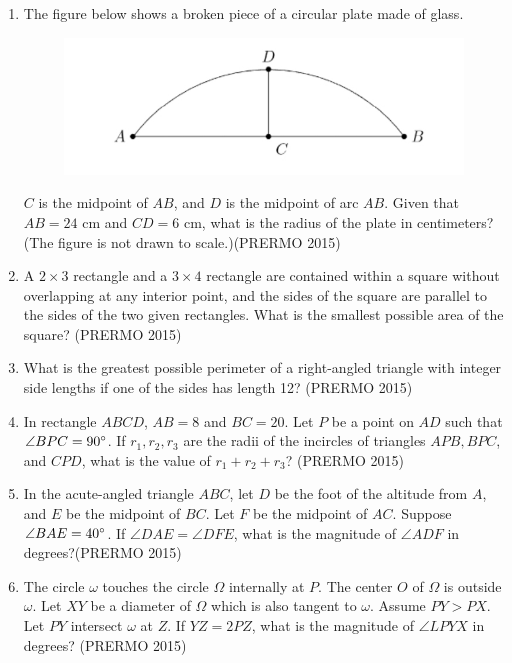 \begin{enumerate}
\item The figure below shows a broken piece of a circular plate made of glass.
    
	  
		\begin{figure}[h!]
    \centering
	    \includegraphics[width=\columnwidth]{olympiad/figs/permo.jpg}
    \end{figure}



    $ C $ is the midpoint of $ AB $, and $ D $ is the midpoint of arc $ AB $. Given that $ AB = 24 $ cm and $ CD = 6 $ cm, what is the radius of the plate in centimeters? (The figure is not drawn to scale.)\hfill(PRERMO 2015)

    \item A $ 2 \times 3 $ rectangle and a $ 3 \times 4 $ rectangle are contained within a square without overlapping at any interior point, and the sides of the square are parallel to the sides of the two given rectangles. What is the smallest possible area of the square? \hfill(PRERMO 2015)

    \item What is the greatest possible perimeter of a right-angled triangle with integer side lengths if one of the sides has length 12? \hfill(PRERMO 2015)

    \item In rectangle $ ABCD $, $ AB = 8 $ and $ BC = 20 $. Let $ P $ be a point on $ AD $ such that $ \angle BPC = 90\degree $. If $ r_1, r_2, r_3 $ are the radii of the incircles of triangles $ APB, BPC $, and $ CPD $, what is the value of $ r_1 + r_2 + r_3 $? \hfill(PRERMO 2015)


\item In the acute-angled triangle $ABC$, let $D$ be the foot of the altitude from $A$, and $E$ be the midpoint of $BC$. Let $F$ be the midpoint of $AC$. Suppose $ \angle BAE = 40\degree $. If $ \angle DAE = \angle DFE $, what is the magnitude of $ \angle ADF $ in degrees?\hfill(PRERMO 2015)

\item The circle $ \omega $ touches the circle $ \Omega $ internally at $ P $. The center $ O $ of $ \Omega $ is outside $ \omega $. Let $XY$ be a diameter of $ \Omega $ which is also tangent to $ \omega $. Assume $ PY > PX $. Let $ PY $ intersect $ \omega $ at $ Z $. If $ YZ = 2PZ $, what is the magnitude of $ \angle LPYX $ in degrees? \hfill(PRERMO 2015)
\end{enumerate}

